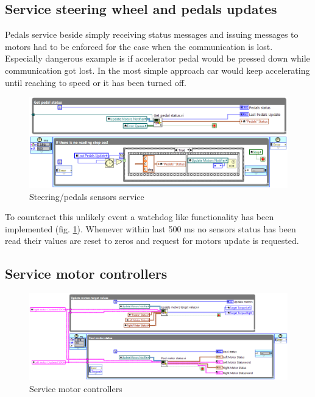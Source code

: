 \subsection{Service steering wheel and pedals updates}
Pedals service beside simply receiving status messages and issuing messages to motors had to be enforced for the case when the communication is lost. Especially dangerous example is if accelerator pedal would be pressed down while communication got lost.
In the most simple approach car would keep accelerating until reaching to speed or it has been turned off.
\begin{figure}[H]
    \centering
    \includegraphics[scale=\visc,max width=\textwidth]{figures/Pedals_status}
    \caption{Steering/pedals sensors service}
    \label{pedals_service}
\end{figure}
To counteract this unlikely event a watchdog like functionality has been implemented (fig. \ref{pedals_service}). Whenever within last 500 ms no sensors status has been read their values are reset to zeros and request for motors update is requested.

\subsection{Service motor controllers}
\begin{figure}[H]
    \centering
    \includegraphics[scale=\visc,max width=\textwidth]{figures/Run_maind1_e}
    \caption{Service motor controllers}
    \label{s_m_c}
\end{figure}

